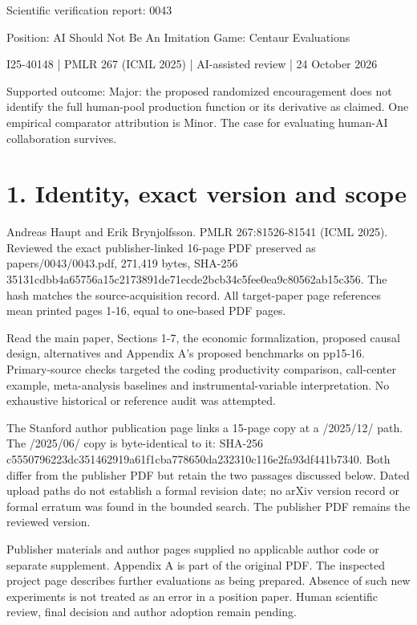 \documentclass[10pt]{article}
\begin{document}
Scientific verification report: 0043\par
Position: AI Should Not Be An Imitation Game: Centaur Evaluations\par
I25-40148 | PMLR 267 (ICML 2025) | AI-assisted review | 24 October 2026\par
Supported outcome: Major: the proposed randomized encouragement does not identify the full human-pool production function or its derivative as claimed. One empirical comparator attribution is Minor. The case for evaluating human-AI collaboration survives.\par
\section*{1. Identity, exact version and scope}
Andreas Haupt and Erik Brynjolfsson. PMLR 267:81526-81541 (ICML 2025). Reviewed the exact publisher-linked 16-page PDF preserved as papers/0043/0043.pdf, 271,419 bytes, SHA-256 35131cdbb4a65756a15c2173891de71ecde2bcb34c5fee0ea9c80562ab15c356. The hash matches the source-acquisition record. All target-paper page references mean printed pages 1-16, equal to one-based PDF pages.\par
Read the main paper, Sections 1-7, the economic formalization, proposed causal design, alternatives and Appendix A’s proposed benchmarks on pp15-16. Primary-source checks targeted the coding productivity comparison, call-center example, meta-analysis baselines and instrumental-variable interpretation. No exhaustive historical or reference audit was attempted.\par
The Stanford author publication page links a 15-page copy at a /2025/12/ path. The /2025/06/ copy is byte-identical to it: SHA-256 c5550796223dc351462919a61f1cba778650da232310c116e2fa93df441b7340. Both differ from the publisher PDF but retain the two passages discussed below. Dated upload paths do not establish a formal revision date; no arXiv version record or formal erratum was found in the bounded search. The publisher PDF remains the reviewed version.\par
Publisher materials and author pages supplied no applicable author code or separate supplement. Appendix A is part of the original PDF. The inspected project page describes further evaluations as being prepared. Absence of such new experiments is not treated as an error in a position paper. Human scientific review, final decision and author adoption remain pending.\par
\end{document}
